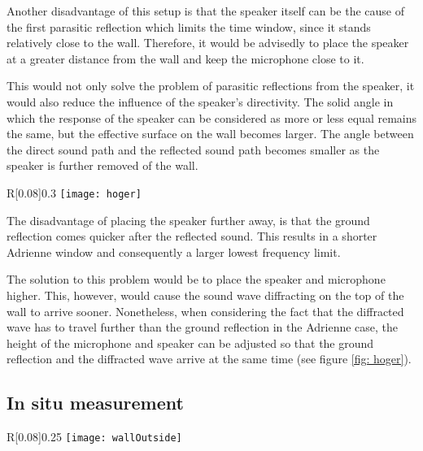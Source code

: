 Another disadvantage of this setup is that the speaker itself can be the cause of the first parasitic reflection which limits the time window, since it stands relatively close to the wall. Therefore, it would be advisedly to place the speaker at a greater distance from the wall and keep the microphone close to it.

This would not only solve the problem of parasitic reflections from the speaker, it would also reduce the influence of the speaker's directivity. The solid angle in which the response of the speaker can be considered as more or less equal remains the same, but the effective surface on the wall becomes larger. The angle between the direct sound path and the reflected sound path becomes smaller as the speaker is further removed of the wall.

\begin{wrapfigure}{R}[0.08\textwidth]{0.3\textwidth}
  \centering
    \texttt{[image: hoger]}
  \caption{Paths of the ground reflection and top diffraction.}
  \label{fig: hoger}
  \vspace{-20pt}
\end{wrapfigure}

The disadvantage of placing the speaker further away, is that the ground reflection comes quicker after the reflected sound. This results in a shorter Adrienne window and consequently a larger lowest frequency limit.

The solution to this problem would be to place the speaker and microphone higher. This, however, would cause the sound wave diffracting on the top of the wall to arrive sooner. Nonetheless, when considering the fact that the diffracted wave has to travel further than the ground reflection in the Adrienne case, the height of the microphone and speaker can be adjusted so that the ground reflection and the diffracted wave arrive at the same time (see figure \ref{fig: hoger}).




\subsection{In situ measurement}\label{insitu}
\begin{wrapfigure}{R}[0.08\textwidth]{0.25\textwidth}
  \centering
    \texttt{[image: wallOutside]}
  \caption{Picture of the wall and setup.}
  \label{fig: wall}
\end{wrapfigure}



